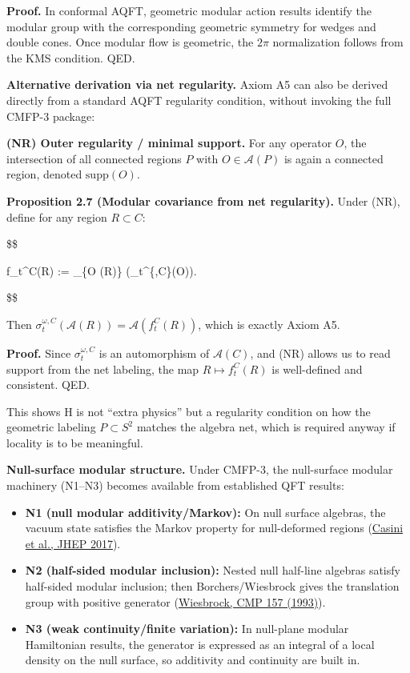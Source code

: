 \documentclass[11pt,a4paper]{article}
\theoremstyle{remark}
\begin{document}
\textbf{Proof.} In conformal AQFT, geometric modular action results identify the
modular group with the corresponding geometric symmetry for wedges and
double cones. Once modular flow is geometric, the \(2\pi\) normalization
follows from the KMS condition. QED.

\textbf{Alternative derivation via net regularity.} Axiom A5 can also be
derived directly from a standard AQFT regularity condition, without
invoking the full CMFP-3 package:

\textbf{(NR) Outer regularity / minimal support.} For any operator \(O\), the
intersection of all connected regions \(P\) with \(O \in \mathcal{A}(P)\) is
again a connected region, denoted \(\mathrm{supp}(O)\).

\textbf{Proposition 2.7 (Modular covariance from net regularity).} Under (NR),
define for any region \(R \subset C\):

\$\$

f\_t\^{}C(R) := \bigcup\_\{O \in {}(R)\} \left(\sigma\_t\^{}\{\omega,C\}(O)\right).

\$\$

Then \(\sigma_t^{\omega,C}(\mathcal{A}(R)) = \mathcal{A}(f_t^C(R))\), which
is exactly Axiom A5.

\textbf{Proof.} Since \(\sigma_t^{\omega,C}\) is an automorphism of \(\mathcal{A}(C)\),
and (NR) allows us to read support from the net labeling, the map
\(R \mapsto f_t^C(R)\) is well-defined and consistent. QED.

This shows H is not ``extra physics'' but a regularity condition on how the
geometric labeling \(P \subset S^2\) matches the algebra net, which is
required anyway if locality is to be meaningful.

\textbf{Null-surface modular structure.} Under CMFP-3, the null-surface modular
machinery (N1--N3) becomes available from established QFT results:

\begin{itemize}
\item
  \textbf{N1 (null modular additivity/Markov):} On null surface algebras, the vacuum
  state satisfies the Markov property for null-deformed regions
  (\href{https://arxiv.org/abs/1703.10656}{Casini et al., JHEP 2017}).
\item
  \textbf{N2 (half-sided modular inclusion):} Nested null half-line algebras satisfy
  half-sided modular inclusion; then Borchers/Wiesbrock gives the translation
  group with positive generator
  (\href{https://projecteuclid.org/journals/communications-in-mathematical-physics/volume-157/issue-1/Half-sided-modular-inclusions-of-von-Neumann-algebras/cmp/1104253848.pdf}{Wiesbrock, CMP 157 (1993)}).
\item
  \textbf{N3 (weak continuity/finite variation):} In null-plane modular Hamiltonian
  results, the generator is expressed as an integral of a local density on the
  null surface, so additivity and continuity are built in.
\end{itemize}
\end{document}
